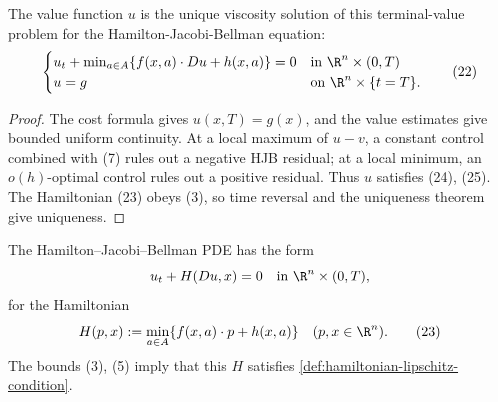 \begin{theorem}
\label{thm:value-function-solves-hjb-equation}
The value function $u$ is the unique viscosity solution of this terminal-value problem for the Hamilton-Jacobi-Bellman equation:
\[
\begin{cases}
u_t + \min_{a \in A}\{f(x,a) \cdot Du + h(x,a)\} = 0 & \text{in } \R^n \times (0,T) \\
u = g & \text{on } \R^n \times \{t = T\}.
\end{cases}
\tag{22}
\]
\end{theorem}

\begin{proof}
\sketch The cost formula gives $u(x,T)=g(x)$, and the value estimates give bounded uniform continuity. At a local maximum of $u-v$, a constant control combined with (7) rules out a negative HJB residual; at a local minimum, an $o(h)$-optimal control rules out a positive residual. Thus $u$ satisfies (24), (25). The Hamiltonian (23) obeys (3), so time reversal and the uniqueness theorem give uniqueness.
\end{proof}

\begin{remark}
\label{rem:hjb-hamiltonian-formula}
The Hamilton--Jacobi--Bellman PDE has the form
\[
u_t + H(Du, x) = 0 \quad \text{in } \R^n \times (0,T),
\]
for the Hamiltonian
\[
H(p,x) := \min_{a \in A}\{f(x,a) \cdot p + h(x,a)\} \quad (p, x \in \R^n).
\tag{23}
\]
The bounds (3), (5) imply that this $H$ satisfies \cref{def:hamiltonian-lipschitz-condition}.
\end{remark}


